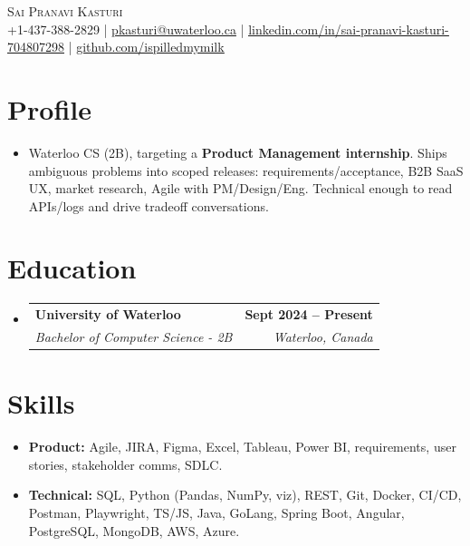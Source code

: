 \documentclass[letterpaper,11pt]{article}
\makeatletter
\newcommand{\resumeSubheading}[4]{
  \vspace{-2pt}\item
    \begin{tabular*}{1.0\textwidth}[t]{l@{\extracolsep{\fill}}r}
      \textbf{#1} & \textbf{\small #2} \\
      \textit{\small#3} & \textit{\small#4} \\[-2pt]
    \end{tabular*}\vspace{-2pt}
}
\newcommand{\resumeSubHeadingListStart}{\begin{itemize}[leftmargin=0.0in, label={}]}
\newcommand{\resumeSubHeadingListEnd}{\end{itemize}}
\makeatother
\begin{document}
\vspace{-18pt}
\begin{center}
    {\Huge \scshape Sai Pranavi Kasturi} \\
    \small +1-437-388-2829 | \underline{pkasturi@uwaterloo.ca} | \href{https://linkedin.com/in/sai-pranavi-kasturi-704807298}{\underline{linkedin.com/in/sai-pranavi-kasturi-704807298}} | \href{https://github.com/ispilledmymilk}{\underline{github.com/ispilledmymilk}}
\end{center}

\vspace{-6pt}
\section{Profile}
\begin{itemize}[leftmargin=0.05in, label={}]
  \small\item{Waterloo CS (2B), targeting a \textbf{Product Management internship}. Ships ambiguous problems into scoped releases: requirements/acceptance, B2B SaaS UX, market research, Agile with PM/Design/Eng. Technical enough to read APIs/logs and drive tradeoff conversations.}
\end{itemize}
\vspace{-8pt}

\section{Education}
  \resumeSubHeadingListStart
    \resumeSubheading
      {University of Waterloo}{Sept 2024 -- Present}
      {Bachelor of Computer Science - 2B}{Waterloo, Canada}
  \resumeSubHeadingListEnd

\section{Skills}
\begin{itemize}[leftmargin=0.05in, label={}]
  \small\item{\textbf{Product:} Agile, JIRA, Figma, Excel, Tableau, Power BI, requirements, user stories, stakeholder comms, SDLC.}
  \small\item{\textbf{Technical:} SQL, Python (Pandas, NumPy, viz), REST, Git, Docker, CI/CD, Postman, Playwright, TS/JS, Java, GoLang, Spring Boot, Angular, PostgreSQL, MongoDB, AWS, Azure.}
\end{itemize}
\vspace{-8pt}
\end{document}
